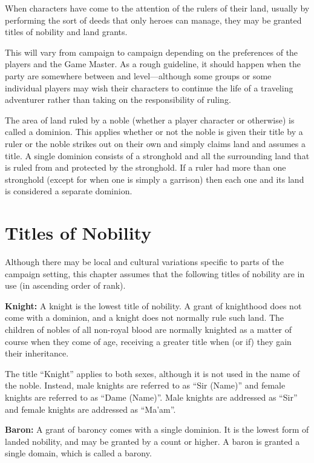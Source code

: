 \begin{multicols*}{2}
When characters have come to the attention of the rulers of their land, usually by performing the sort of deeds that only heroes can manage, they may be granted titles of nobility and land grants.

This will vary from campaign to campaign depending on the preferences of the players and the Game Master. As a rough guideline, it should happen when the party are somewhere between  and  level—although some groups or some individual players may wish their characters to continue the life of a traveling adventurer rather than taking on the responsibility of ruling.

The area of land ruled by a noble (whether a player character or otherwise) is called a dominion. This applies whether or not the noble is given their title by a ruler or the noble strikes out on their own and simply claims land and assumes a title. A single dominion consists of a stronghold and all the surrounding land that is ruled from and protected by the stronghold. If a ruler had more than one stronghold (except for when one is simply a garrison) then each one and its land is considered a separate dominion.

\section{Titles of Nobility}
Although there may be local and cultural variations specific to parts of the campaign setting, this chapter assumes that the following titles of nobility are in use (in ascending order of rank).

\textbf{Knight:} A knight is the lowest title of nobility. A grant of knighthood does not come with a dominion, and a knight does not normally rule such land. The children of nobles of all non-royal blood are normally knighted as a matter of course when they come of age, receiving a greater title when (or if) they gain their inheritance.

The title “Knight” applies to both sexes, although it is not used in the name of the noble. Instead, male knights are referred to as “Sir (Name)” and female knights are referred to as “Dame (Name)”. Male knights are addressed as “Sir” and female knights are addressed as “Ma’am”.

\textbf{Baron:} A grant of baroncy comes with a single dominion. It is the lowest form of landed nobility, and may be granted by a count or higher. A baron is granted a single domain, which is called a barony.


\end{multicols*}
